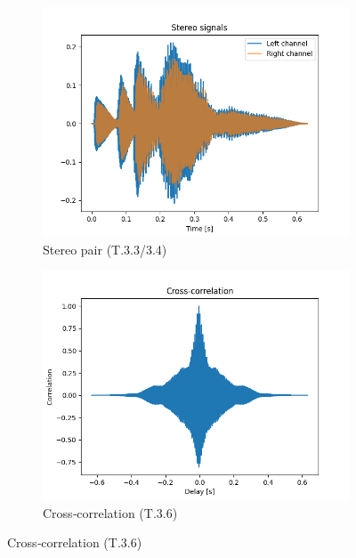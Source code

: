 \documentclass{article}
\begin{document}
\begin{figure}[H]
\medskip
\begin{subfigure}{0.45\linewidth}
  \includegraphics[width=\linewidth]{results/figures/task3_4_signals_with_scaling_and_delay.png}
  \caption{Stereo pair (T.3.3/3.4)}
\end{subfigure}\hfill
\begin{subfigure}{0.45\linewidth}
  \includegraphics[width=\linewidth]{results/figures/task3_6_cross_correlation.png}
  \caption{Cross‑correlation (T.3.6)}
\end{subfigure}


\end{figure}
\end{document}
